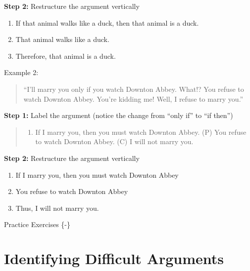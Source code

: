 \documentclass[
]{book}
\providecommand{\tightlist}{%
  \setlength{\itemsep}{0pt}\setlength{\parskip}{0pt}}
\begin{document}
\begin{reflect}
\textbf{Step 2:} Restructure the argument vertically

\begin{enumerate}
\def\labelenumi{\arabic{enumi}.}
\tightlist
\item
  If that animal walks like a duck, then that animal is a duck.\\
\item
  That animal walks like a duck.\\
\item
  Therefore, that animal is a duck.
\end{enumerate}

{Example 2:}

\begin{quote}
``I'll marry you only if you watch Downton Abbey. What!? You refuse to watch Downton Abbey. You're kidding me! Well, I refuse to marry you.''
\end{quote}

\textbf{Step 1:} Label the argument (notice the change from ``only if'' to ``if then'')

\begin{quote}
\begin{enumerate}
\def\labelenumi{(\Alph{enumi})}
\setcounter{enumi}{15}
\tightlist
\item
  If I marry you, then you must watch Downton Abbey. (P) You refuse to watch Downton Abbey. (C) I will not marry you.
\end{enumerate}
\end{quote}

\textbf{Step 2:} Restructure the argument vertically

\begin{enumerate}
\def\labelenumi{\arabic{enumi}.}
\tightlist
\item
  If I marry you, then you must watch Downton Abbey\\
\item
  You refuse to watch Downton Abbey\\
\item
  Thus, I will not marry you.
\end{enumerate}

Practice Exercises \{-\}
\end{reflect}

\hypertarget{identifying-difficult-arguments}{%
\section{Identifying Difficult Arguments}\label{identifying-difficult-arguments}}
\end{document}

